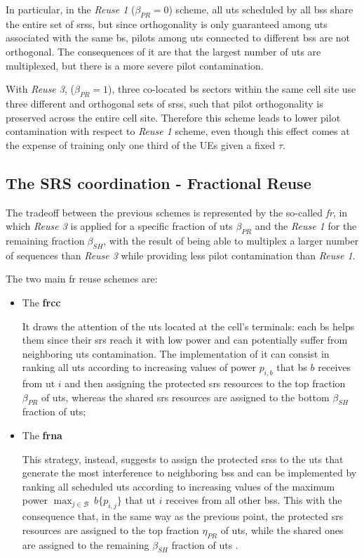 \documentclass[11pt]{book}
\begin{document}
In particular, in the \textit{Reuse 1} ($\beta_{PR} = 0$) scheme, all \gls{ut}s scheduled by all \gls{bs}s share the entire set of \gls{srs}s, but since orthogonality is only guaranteed among \gls{ut}s associated with the same \gls{bs}, pilots among \gls{ut}s connected to different \gls{bs}s are not orthogonal. The consequences of it are that the largest number of \gls{ut}s are multiplexed, but there is a more severe
pilot contamination.

With \textit{Reuse 3}, ($\beta_{PR} = 1$), three co-located \gls{bs} sectors within the same cell site use three different and orthogonal sets of \gls{srs}s, such that pilot orthogonality is preserved across the entire cell site. Therefore this scheme leads to lower pilot contamination with respect to \textit{Reuse 1} scheme, even though this effect comes at the expense of training only one third of the UEs given a fixed $\tau$.

\subsection{The SRS coordination - Fractional Reuse}
The tradeoff between the previous schemes is represented by the so-called \textit{\gls{fr}}, in which \textit{Reuse 3} is applied for a specific fraction of \gls{ut}s $\beta_{PR}$ and the \textit{Reuse 1} for the remaining fraction$\beta_{SH}$, with the result of being able to multiplex a larger number of
sequences than \textit{Reuse 3} while providing less pilot contamination than \textit{Reuse 1}.

The two main \gls{fr} reuse schemes are:
\begin{itemize}
  \item The \textbf{\gls{frcc}}

   It draws the attention of the \gls{ut}s located at the cell's terminals: each \gls{bs} helps them since their \gls{srs} reach it with low power and can potentially suffer from neighboring \gls{ut}s contamination. The implementation of it can consist in ranking all \gls{ut}s according to increasing values of power $p_{i,b}$ that \gls{bs} $b$ receives from \gls{ut} $i$ and then assigning the protected \gls{srs} resources to the top fraction $\beta_{PR}$ of \gls{ut}s, whereas the shared \gls{srs} resources are assigned to the bottom $\beta_{SH}$ fraction of \gls{ut}s;
  \item The \textbf{\gls{frna}}

  This strategy, instead, suggests to assign the protected \gls{srs}s to the \gls{ut}s that generate the most interference to neighboring \gls{bs}s and can be implemented by ranking all scheduled \gls{ut}s according to increasing values of the maximum power $\max_{j\in\mathcal{B}}\ b\{p_{i,j}\}$ that \gls{ut} $i$ receives from all other \gls{bs}s. This with the consequence that, in the same way as the previous point, the protected \gls{srs} resources are assigned to the top fraction $\eta_{PR}$ of \gls{ut}s, while the shared ones are assigned to the remaining $\beta_{SH}$ fraction of \gls{ut}s \cite{Giordano}.
\end{itemize}



\end{document}
